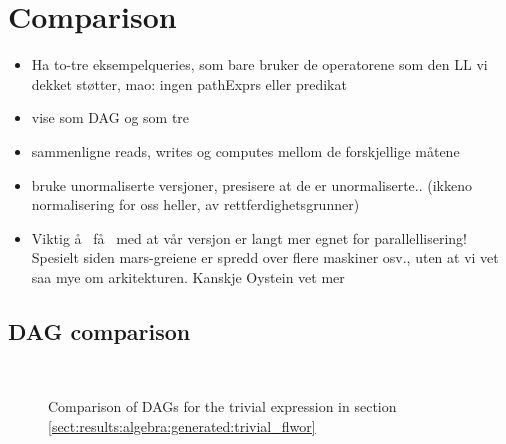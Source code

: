 \section{Comparison}
\label{sect:results:comparison}
\begin{itemize}
  \item Ha to-tre eksempelqueries, som bare bruker de operatorene som den LL vi dekket st\o tter, mao: ingen
  pathExprs eller predikat
  \item vise som DAG og som tre
  \item sammenligne reads, writes og computes mellom de forskjellige m\aa tene
  \item bruke unormaliserte versjoner, presisere at de er unormaliserte.. (ikkeno normalisering for oss heller, av
  rettferdighetsgrunner)
  \item Viktig \aa~ f\aa~ med at v\aa r versjon er langt mer egnet for
  parallellisering! Spesielt siden mars-greiene er spredd over flere maskiner
  osv., uten at vi vet saa mye om arkitekturen. Kanskje Oystein vet mer
\end{itemize}

\subsection{DAG comparison}

\begin{figure}[!h]
	\centering
	\mbox{
		\quad
	}
	\caption{Comparison of DAGs for the trivial expression in section
	\ref{sect:results:algebra:generated:trivial_flwor}}
\end{figure}

